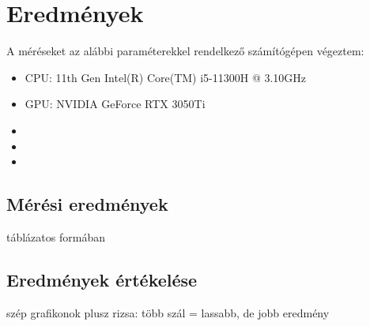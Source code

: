 \chapter{Eredmények}

A méréseket az alábbi paraméterekkel rendelkező számítógépen végeztem:
\begin{itemize}
	\item	CPU: 11th Gen Intel(R) Core(TM) i5-11300H @ 3.10GHz
	\item	GPU: NVIDIA GeForce RTX 3050Ti 
	\item 
	\item 
	\item 
	
\end{itemize}

\section{Mérési eredmények}

táblázatos formában

\section{Eredmények értékelése}

szép grafikonok plusz rizsa: több szál = lassabb, de jobb eredmény